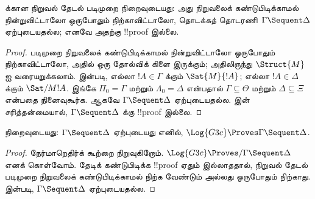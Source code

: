 \documentclass[../../../include/open-logic-section]{subfiles}
\begin{document}
\begin{cor}  க்கான
நிறுவல் தேடல் படிமுறை நிறைவுடையது: அது நிறுவலைக்
கண்டுபிடிக்காமல் நின்றுவிட்டாலோ ஒருபோதும் நிற்காவிட்டாலோ,
தொடக்கத் தொடரணி~$\Gamma \Sequent \Delta$
ஏற்புடையதல்ல; எனவே அதற்கு !!{proof} இல்லை.
\end{cor}

\begin{proof}
  படிமுறை நிறுவலைக் கண்டுபிடிக்காமல் நின்றுவிட்டாலோ
  ஒருபோதும் நிற்காவிட்டாலோ, அதில் ஒரு தோல்விக் கிளை
  இருக்கும்; அதிலிருந்து $\Struct{M}$ ஐ வரையறுக்கலாம்.
   இன்படி, எல்லா
  $!A \in \Gamma$ க்கும் $\Sat{M}{!A}$;
  எல்லா $!A \in \Delta$ க்கும் $\Sat/{M}{!A}$.
  இங்கே $\Pi_0 = \Gamma$ மற்றும் $\Lambda_0 = \Delta$
  என்பதால் $\Gamma \subseteq \Theta$ மற்றும்
  $\Delta \subseteq \Xi$ என்பதை நினைவுகூர்க.
  ஆகவே $\Gamma \Sequent \Delta$ ஏற்புடையதல்ல.
   இன் சரித்தன்மையால்,
  $\Gamma \Sequent \Delta$ க்கு !!{proof} இல்லை.
\end{proof}

\begin{cor}
 நிறைவுடையது: $\Gamma \Sequent \Delta$
ஏற்புடையது எனில்,
$\Log{G3c} \Proves \Gamma \Sequent \Delta$.
\end{cor}

\begin{proof}
  நேர்மாறெதிர்க் கூற்றை நிறுவுகிறோம்.
  $\Log{G3c} \Proves/ \Gamma \Sequent \Delta$
  எனக் கொள்வோம். தேடிக் கண்டுபிடிக்க !!{proof} ஏதும்
  இல்லாததால், நிறுவல் தேடல் படிமுறை நிறுவலைக்
  கண்டுபிடிக்காமல் நிற்க வேண்டும் அல்லது ஒருபோதும்
  நிற்காது.  இன்படி,
  $\Gamma \Sequent \Delta$ ஏற்புடையதல்ல.
\end{proof}
\end{document}
